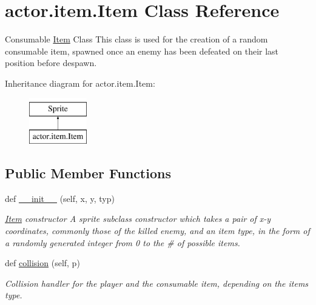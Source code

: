 \hypertarget{classactor_1_1item_1_1_item}{}\section{actor.\+item.\+Item Class Reference}
\label{classactor_1_1item_1_1_item}


Consumable \hyperlink{classactor_1_1item_1_1_item}{Item} Class  This class is used for the creation of a random consumable item, spawned once an enemy has been defeated on their last position before despawn.  


Inheritance diagram for actor.\+item.\+Item\+:\begin{figure}[H]
\begin{center}
\leavevmode
\includegraphics[height=2.000000cm]{classactor_1_1item_1_1_item}
\end{center}
\end{figure}
\subsection*{Public Member Functions}
\begin{DoxyCompactItemize}
\item 
def \hyperlink{classactor_1_1item_1_1_item_a13d4ef784805457c46d4c6872aa0903d}{\+\_\+\+\_\+init\+\_\+\+\_\+} (self, x, y, typ)
\begin{DoxyCompactList}\small\item\em \hyperlink{classactor_1_1item_1_1_item}{Item} constructor  A sprite subclass constructor which takes a pair of x-\/y coordinates, commonly those of the killed enemy, and an item type, in the form of a randomly generated integer from 0 to the \# of possible items. \end{DoxyCompactList}\item 
def \hyperlink{classactor_1_1item_1_1_item_a3ad3940f06483ccce49fe2673896555f}{collision} (self, p)
\begin{DoxyCompactList}\small\item\em Collision handler for the player and the consumable item, depending on the item\textquotesingle{}s type. \end{DoxyCompactList}\end{DoxyCompactItemize}
